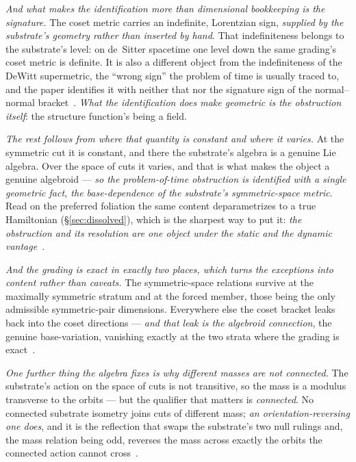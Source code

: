\documentclass[11pt,a4paper]{article}
\theoremstyle{plain}
\theoremstyle{definition}
\begin{document}
\emph{And what makes the identification more than dimensional bookkeeping is the signature.} The coset metric
carries an indefinite, Lorentzian sign, \emph{supplied by the substrate's geometry rather than inserted by
hand}. That indefiniteness belongs to the substrate's level: on de~Sitter spacetime one level down the same
grading's coset metric is definite. It is also a different object from the indefiniteness of the DeWitt
supermetric, the ``wrong sign'' the problem of time is usually traced to, and the paper identifies it with
neither that nor the signature sign of the normal--normal bracket~\cite{JanzenAlgebroid}. \emph{What the
identification does make geometric is the obstruction itself}: the structure function's being a field.

\emph{The rest follows from where that quantity is constant and where it varies.} At the symmetric cut it is
constant, and there the substrate's algebra is a genuine Lie algebra. Over the space of cuts it varies, and
that is what makes the object a genuine algebroid --- \emph{so the problem-of-time obstruction is identified
with a single geometric fact, the base-dependence of the substrate's symmetric-space metric}. Read on the preferred foliation the same content deparametrizes to a
true Hamiltonian (\S\ref{sec:dissolved}), which is the sharpest way to put it: \emph{the obstruction and its
resolution are one object under the static and the dynamic vantage}~\cite{JanzenAlgebroid}.

\emph{And the grading is exact in exactly two places, which turns the exceptions into content rather than
caveats.} The symmetric-space relations survive at the maximally symmetric stratum and at the forced member,
those being the only admissible symmetric-pair dimensions. Everywhere else the coset bracket leaks back into
the coset directions --- \emph{and that leak is the algebroid connection}, the genuine base-variation,
vanishing exactly at the two strata where the grading is exact~\cite{JanzenAlgebroid}.

\emph{One further thing the algebra fixes is why different masses are not connected.} The substrate's action
on the space of cuts is not transitive, so the mass is a modulus transverse to the orbits --- but the
qualifier that matters is \emph{connected}. No connected substrate isometry joins cuts of different mass;
\emph{an orientation-reversing one does}, and it is the reflection that swaps the substrate's two null
rulings and, the mass relation being odd, reverses the mass across exactly the orbits the connected action
cannot cross~\cite{JanzenAlgebroid}.
\end{document}
